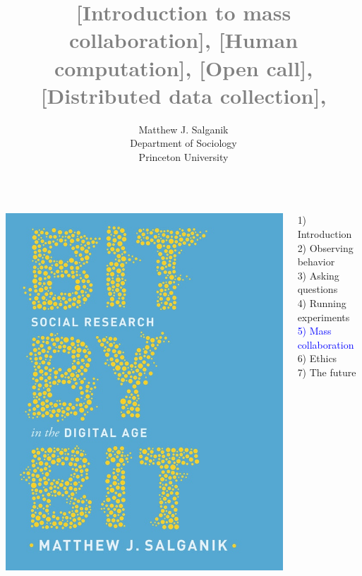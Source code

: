 \documentclass[aspectratio=169]{beamer}
\title[]{\textcolor{gray}{[Introduction to mass collaboration], [Human computation], [Open call], [Distributed data collection],} \newline [Fragile Families Challenge]}
\author[]{Matthew J. Salganik\\Department of Sociology\\Princeton University}
\date[]{%
\begin{flushright}
\texttt{[image: figures/cc-by.png]}
\end{flushright}
}
\begin{document}
\frame{\titlepage}
\begin{frame}

\begin{columns}
\begin{column}{.40\textwidth}
\includegraphics[width=\textwidth]{figures/salganik_bit_2018_cover}
\end{column}%

\hfill%

\begin{column}{.60\textwidth}
1) Introduction \\
2) Observing behavior \\
3) Asking questions \\
4) Running experiments \\
\textcolor{blue}{5) Mass collaboration} \\
6) Ethics \\
7) The future \\
\end{column}%
\end{columns}

\end{frame}
\end{document}
